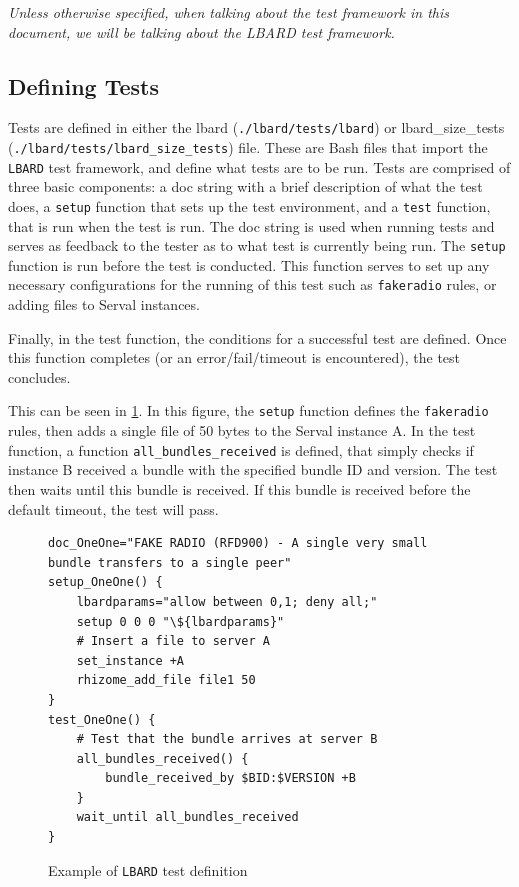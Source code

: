 \emph{Unless otherwise specified, when talking about the test framework in this document, we will be talking about the LBARD test framework.}


\subsection{Defining Tests}
Tests are defined in either the lbard (\texttt{./lbard/tests/lbard}) or lbard\_size\_tests (\texttt{./lbard/tests/lbard\_size\_tests}) file. 
These are Bash files that import the \texttt{LBARD} test framework, and define what tests are to be run.
Tests are comprised of three basic components: a doc string with a brief description of what the test does, a \texttt{setup} function that sets up the test environment, and a \texttt{test} function, that is run when the test is run.
The doc string is used when running tests and serves as feedback to the tester as to what test is currently being run.
The \texttt{setup} function is run before the test is conducted. 
This function serves to set up any necessary configurations for the running of this test such as \texttt{fakeradio} rules, or adding files to Serval instances.

Finally, in the test function, the conditions for a successful test are defined. Once this function completes (or an error/fail/timeout is encountered), the test concludes.


This can be seen in \figurename{ \ref{fig:testDefinition}}. 
In this figure, the \texttt{setup} function defines the \texttt{fakeradio} rules, then adds a single file of 50 bytes to the Serval instance A. 
In the test function, a function \texttt{all\_bundles\_received} is defined, that simply checks if instance B received a bundle with the specified bundle ID and version. 
The test then waits until this bundle is received. 
If this bundle is received before the default timeout, the test will pass.

\lstset{language=bash,
showstringspaces=false,
numbers=left,
}

\begin{figure}
    \begin{centering}

\begin{lstlisting}[breaklines, frame=single]
doc_OneOne="FAKE RADIO (RFD900) - A single very small bundle transfers to a single peer"
setup_OneOne() {
    lbardparams="allow between 0,1; deny all;"
    setup 0 0 0 "\${lbardparams}" 
    # Insert a file to server A
    set_instance +A
    rhizome_add_file file1 50
}
test_OneOne() {
    # Test that the bundle arrives at server B
    all_bundles_received() {
        bundle_received_by $BID:$VERSION +B 
    }
    wait_until all_bundles_received
} 
\end{lstlisting}
        \caption{Example of \texttt{LBARD} test definition}
        \label{fig:testDefinition}
    \end{centering}
\end{figure}

